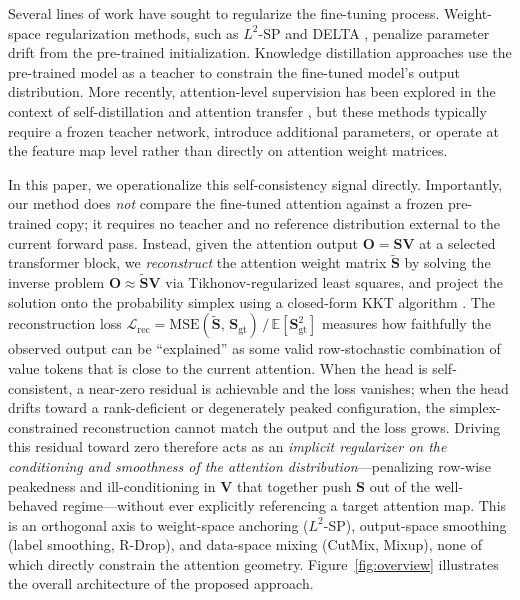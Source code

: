 \documentclass[review,12pt,authoryear]{elsarticle}
\begin{document}
Several lines of work have sought to regularize the fine-tuning process.
Weight-space regularization methods, such as $L^2$-SP \citep{li2018explicit} and DELTA \citep{li2019delta}, penalize parameter drift from the pre-trained initialization.
Knowledge distillation approaches \citep{hinton2015distilling} use the pre-trained model as a teacher to constrain the fine-tuned model's output distribution.
More recently, attention-level supervision has been explored in the context of self-distillation \citep{zhang2019your} and attention transfer \citep{zagoruyko2017paying}, but these methods typically require a frozen teacher network, introduce additional parameters, or operate at the feature map level rather than directly on attention weight matrices.

In this paper, we operationalize this self-consistency signal directly.
Importantly, our method does \emph{not} compare the fine-tuned attention against a frozen pre-trained copy; it requires no teacher and no reference distribution external to the current forward pass.
Instead, given the attention output $\mathbf{O} = \mathbf{S}\mathbf{V}$ at a selected transformer block, we \emph{reconstruct} the attention weight matrix $\tilde{\mathbf{S}}$ by solving the inverse problem $\mathbf{O} \approx \tilde{\mathbf{S}}\mathbf{V}$ via Tikhonov-regularized least squares, and project the solution onto the probability simplex using a closed-form KKT algorithm \citep{duchi2008efficient}.
The reconstruction loss $\mathcal{L}_{\text{rec}} = \text{MSE}(\tilde{\mathbf{S}},\, \mathbf{S}_{\text{gt}}) \,/\, \mathbb{E}[\mathbf{S}_{\text{gt}}^2]$ measures how faithfully the observed output can be ``explained'' as some valid row-stochastic combination of value tokens that is close to the current attention.
When the head is self-consistent, a near-zero residual is achievable and the loss vanishes; when the head drifts toward a rank-deficient or degenerately peaked configuration, the simplex-constrained reconstruction cannot match the output and the loss grows.
Driving this residual toward zero therefore acts as an \emph{implicit regularizer on the conditioning and smoothness of the attention distribution}---penalizing row-wise peakedness and ill-conditioning in $\mathbf{V}$ that together push $\mathbf{S}$ out of the well-behaved regime---without ever explicitly referencing a target attention map.
This is an orthogonal axis to weight-space anchoring ($L^2$-SP), output-space smoothing (label smoothing, R-Drop), and data-space mixing (CutMix, Mixup), none of which directly constrain the attention geometry.
Figure~\ref{fig:overview} illustrates the overall architecture of the proposed approach.
\end{document}
